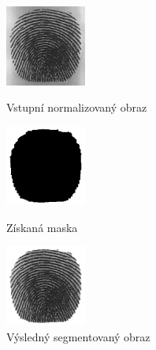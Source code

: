 \begin{figure}[htbp]
  \begin{minipage}[b]{0.3\linewidth}
    \centering
    \includegraphics[width=100]{obrazky-figures/105_5norm.png}
    \caption{Vstupní normalizovaný obraz}
    \label{fig:normimg105}
  \end{minipage}
  \hspace{0.3cm}
  \begin{minipage}[b]{0.3\linewidth}
    \centering
    \includegraphics[width=100]{obrazky-figures/105_5mask.png}
    \caption{Získaná maska}
    \label{fig:mask}
  \end{minipage}
  \hspace{0.3cm}
    \begin{minipage}[b]{0.3\linewidth}
    \centering
    \includegraphics[width=100]{obrazky-figures/105_5segment.png}
    \caption{Výsledný segmentovaný obraz}
    \label{fig:mask}
  \end{minipage}
\end{figure}

